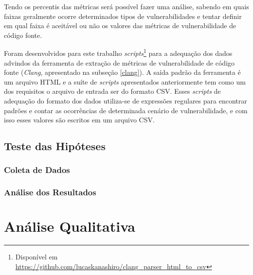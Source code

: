 Tendo os percentis das métricas será possível fazer uma análise, sabendo em quais faixas geralmente ocorre 
determinados tipos de vulnerabilidades e tentar definir em qual faixa é aceitável ou não os valores das métricas de 
vulnerabilidade de código fonte.

Foram desenvolvidos para este trabalho \textit{scripts}\footnote{Disponível em
\url{https://github.com/lucaskanashiro/clang\_parser\_html\_to\_csv}} para a adequação dos
dados advindos da ferramenta de extração de métricas de vulnerabilidade de
código fonte (\emph{Clang}, apresentado na subseção \ref{clang}). A saída padrão
da ferramenta é um arquivo HTML e a suíte de \textit{scripts} apresentados
anteriormente tem como um dos requisitos o arquivo de entrada ser do formato
CSV. Esses \textit{scripts} de adequação do formato dos dados utiliza-se de
expressões regulares para encontrar padrões e contar as ocorrências de
determinada cenário de vulnerabilidade, e com isso esses valores são escritos em
um arquivo CSV.

\subsection{Teste das Hipóteses} \label{subsec:teste_hipotese}
\subsubsection{Coleta de Dados}
\subsubsection{Análise dos Resultados}

\section{Análise Qualitativa}

